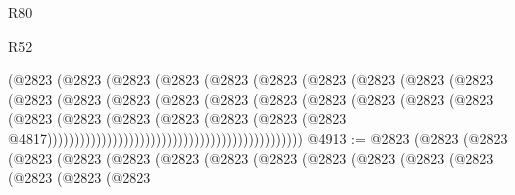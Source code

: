 \begin{lexlean}{R80}
\begin{lexlean}{R52}
\begin{coremodule}
{{{{{{{{{{{{{{{{{{{{{{{{{{{{{{{{{{{{{{{{{{{{{{{{{{{{{{{{{{{{{{{{{{{{{{{{{{{{{{{{{{{{{{{{{{{{{{{{{{{{{{{{{{{{{{{{{{{{{{{{{{{{{{{{{{{{{{{{{{{{{{{{{{{{{{{{{{{{{{{{{{{{{{{{{{{{{{{{{{{{{{{{{{{{{{{{{{{{{{                                            (@2823
                                              (@2823
                                                (@2823
                                                  (@2823
                                                    (@2823
                                                      (@2823
                                                        (@2823
                                                          (@2823
                                                            (@2823
                                                              (@2823
                                                                (@2823
                                                                  (@2823
                                                                    (@2823
                                                                      (@2823
                                                                        (@2823
                                                                          (@2823
                                                                            (@2823
                                                                              (@2823
                                                                                (@2823
                                                                                  (@2823
                                                                                    (@2823
                                                                                      (@2823
                                                                                        (@2823
                                                                                          (@2823
                                                                                            (@2823
                                                                                              (@2823
                                                                                                (@2823
                                                                                                  @4817)))))))))))))))))))))))))))))))))))))))))))))))
@4913 := @2823
    (@2823
      (@2823
        (@2823
          (@2823
            (@2823
              (@2823
                (@2823
                  (@2823
                    (@2823
                      (@2823
                        (@2823
                          (@2823
                            (@2823
                              (@2823
                                (@2823
}}}}}}}}}}}}}}}}}}}}}}}}}}}}}}}}}}}}}}}}}}}}}}}}}}}}}}}}}}}}}}}}}}}}}}}}}}}}}}}}}}}}}}}}}}}}}}}}}}}}}}}}}}}}}}}}}}}}}}}}}}}}}}}}}}}}}}}}}}}}}}}}}}}}}}}}}}}}}}}}}}}}}}}}}}}}}}}}}}}}}}}}}}}}}}}}}}}}}}
\end{coremodule}
\end{lexlean}
\end{lexlean}
